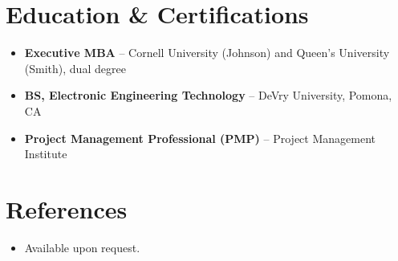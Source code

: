 \documentclass[11pt,letterpaper,sans]{moderncv}
\begin{document}

\section{Education \& Certifications}
\vspace{1pt}
\begin{itemize}
\item{\textbf{Executive MBA} -- Cornell University (Johnson) and Queen's University (Smith), dual degree}
\item{\textbf{BS, Electronic Engineering Technology} -- DeVry University, Pomona, CA}
\item{\textbf{Project Management Professional (PMP)} -- Project Management Institute}
\end{itemize}


\section{References}
\vspace{1pt}
\begin{itemize}
\item{Available upon request.}
\end{itemize}
\end{document}
